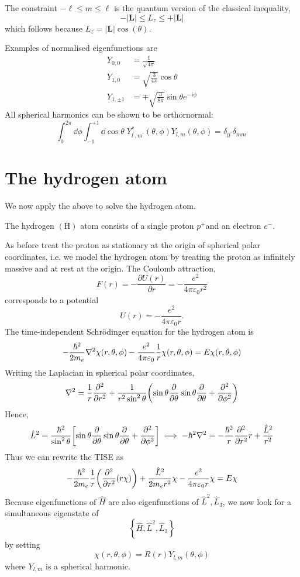\documentclass[a4paper,11pt]{article}
\begin{document}
The constraint $-\ell \leq m \leq \ell$ is the quantum version of the classical inequality,
\[
-|\mathbf{L}| \leq L_z \leq+|\mathbf{L}|
\]
which follows because $L_z=|\mathbf{L}| \cos (\theta)$.

Examples of normalised eigenfunctions are
\begin{align*}
	Y_{0,0}     & = \frac{1}{\sqrt{4 \pi}}                             \\
	Y_{1,0}     & = \sqrt{\frac{3}{4 \pi}} \cos \theta                 \\
	Y_{1,\pm 1} & = \mp \sqrt{\frac{3}{8 \pi}} \sin \theta e^{-i \phi}
\end{align*}
All spherical harmonics can be shown to be orthornormal:
\[
	\int_0^{2 \pi} \dd \phi \int_{-1}^{+1} \dd \cos \theta\; Y_{l^{\prime}, m^{\prime}}^*(\theta, \phi) Y_{l, m}(\theta, \phi)=\delta_{l l^{\prime}} \delta_{m m^{\prime}}
\]

\section{The hydrogen atom}
We now apply the above to solve the hydrogen atom. 
\begin{definition}
	The hydrogen $(\mathrm{H})$ atom consists of a single proton $p^{+}$and an electron $e^{-}$.
\end{definition}

As before treat the proton as stationary at the origin of spherical polar coordinates, i.e. we model the hydrogen atom by treating the proton as infinitely massive and at rest at the origin. The Coulomb attraction,
\[
F(r)=-\frac{\partial U(r)}{\partial r}=-\frac{e^2}{4 \pi \varepsilon_0 r^2}
\]
corresponds to a potential
\[
U(r)=-\frac{e^2}{4 \pi \varepsilon_0 r}.
\]
The time-independent Schr\"odinger equation for the hydrogen atom is
\[
	-\frac{\hbar^2}{2m_e} \laplacian{\chi(r, \theta, \phi)} - \frac{e^2}{4 \pi \varepsilon_0} \frac{1}{r} \chi(r, \theta, \phi) = E \chi(r,\theta, \phi)
\]
Writing the Laplacian in spherical polar coordinates,
\[
	\laplacian{} = \frac{1}{r} \pdv[2]{r} + \frac{1}{r^2 \sin^2 \theta} \qty( \sin \theta \pdv{\theta} \sin \theta \pdv{\theta} + \pdv[2]{\phi} )
\]
Hence,
\[
	\hat L^2 = \frac{\hbar^2}{\sin^2\theta} \qty[ \sin \theta \pdv{\theta} \sin \theta \pdv{\theta} + \pdv[2]{\phi} ] \implies -\hbar^2 \laplacian{} = -\frac{\hbar^2}{r} \pdv[2]{r} r + \frac{\hat L^2}{r^2}
\]
Thus we can rewrite the TISE as
\[
	-\frac{\hbar^2}{2m_e} \frac{1}{r} \qty( \pdv[2]{r} \qty(r \chi) ) + \frac{\hat L^2}{2 m_e r^2} \chi - \frac{e^2}{4 \pi \varepsilon_0 r} \chi = E \chi
\]
Because eigenfunctions of $ \hat H $ are also eigenfunctions of $ \hat L^2, \hat L_3 $, we now look for a simultaneous eigenstate of
\[
\left\{\hat{H}, \hat{L}^2, \hat{L}_3\right\}
\]
by setting
\[
\chi(r, \theta, \phi)=R(r) Y_{l, m}(\theta, \phi)
\]
where $Y_{l, m}$ is a spherical harmonic.
\end{document}
